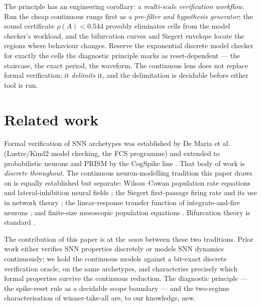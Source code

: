 \documentclass[conference]{IEEEtran}
\begin{document}
The principle has an engineering corollary: a \emph{multi-scale verification
workflow}. Run the cheap continuous rungs first as a \emph{pre-filter and
hypothesis generator}; the sound certificate $\rho(A)<0.544$ provably eliminates
cells from the model checker's workload, and the bifurcation curves and Siegert
envelope locate the regions where behaviour changes. Reserve the exponential
discrete model checker for exactly the cells the diagnostic principle marks as
reset-dependent --- the staircase, the exact period, the waveform. The
continuous lens does not replace formal verification; it \emph{delimits} it, and
the delimitation is decidable before either tool is run.

\section{Related work}\label{sec:related}

Formal verification of SNN archetypes was established by De Maria et al.
\cite{DeMaria2020,naco20} (Lustre/Kind2 model checking, the FCS programme) and
extended to probabilistic neurons and PRISM by the CogSpike line
\cite{cogspike_wd,yao2025probabilistic}. That body of work is \emph{discrete
throughout}. The continuous neuron-modelling tradition this paper draws on is
equally established but separate: Wilson--Cowan population rate equations
\cite{WilsonCowan1972} and lateral-inhibition neural fields \cite{Amari1977};
the Siegert first-passage firing rate \cite{Siegert1951} and its use in network
theory \cite{Brunel2000,BrunelHakim1999}; the linear-response transfer function
of integrate-and-fire neurons \cite{Richardson2007}; and finite-size mesoscopic
population equations \cite{NaudGerstner2012,Schwalger2017}. Bifurcation theory
is standard \cite{Strogatz2014,Kuznetsov2004}.

The contribution of this paper is at the \emph{seam} between these two
traditions. Prior work either verifies SNN properties discretely or models SNN
dynamics continuously; we hold the continuous models against a bit-exact
discrete verification oracle, on the same archetypes, and characterise precisely
which formal properties survive the continuous reduction. The diagnostic
principle --- the spike-reset rule as a decidable scope boundary --- and the
two-regime characterisation of winner-take-all are, to our knowledge, new.
\end{document}
